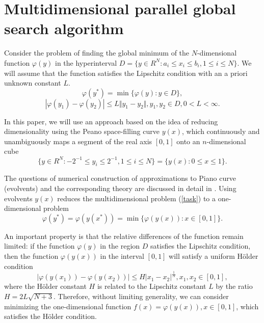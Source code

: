 \documentclass{svproc}
\begin{document}
\section{Multidimensional parallel global search algorithm}
Consider the problem of finding the global minimum of the \(N\)-dimensional function \(\varphi(y)\) in the hyperinterval  \(D=\{y\in R^N:a_i\leqslant x_i\leqslant{b_i}, 1\leqslant{i}\leqslant{N}\}\).  We will assume that the function satisfies the Lipschitz condition with an a priori unknown constant \(L\).
\begin{equation}
\label{task}
\varphi(y^*)=\min\{\varphi(y):y\in D\},
\end{equation}
\begin{equation}
\label{lip}
|\varphi(y_1)-\varphi(y_2)|\leqslant L\Vert y_1-y_2\Vert,y_1,y_2\in D,0<L<\infty.
\end{equation}

In this paper, we will use an approach based on the idea of reducing dimensionality using the Peano space-filling curve \(y(x)\), which continuously and unambiguously maps a segment of the real axis \([0,1]\) onto an \(n\)-dimensional cube
\begin{equation}
\label{cube}
\lbrace y\in R^N:-2^{-1}\leqslant y_i\leqslant 2^{-1},1\leqslant i\leqslant N\rbrace=\{y(x):0\leqslant x\leqslant 1\}.
\end{equation}

The questions of numerical construction of approximations to Piano curve (evolvents) and the corresponding theory are discussed in detail in \cite{Sergeyev2013,Strongin2000}. Using evolvents \(y(x)\) reduces the multidimensional problem (\ref{task}) to a one-dimensional problem
\begin{displaymath}
\label{oneDimTask}
\varphi(y^*)=\varphi(y(x^*))=\min\{\varphi(y(x)):x\in [0,1]\}.
\end{displaymath}

An important property is that the relative differences of the function remain limited: if the function \(\varphi(y)\) in the region \(D\) satisfies the Lipschitz condition, then the function \(\varphi(y(x))\) in the interval \([0,1]\) will satisfy a uniform H{\"o}lder condition
\begin{displaymath}
\label{holder}
|\varphi(y(x_1))-\varphi(y(x_2))|\leqslant H{|x_1-x_2|}^{\frac{1}{N}}, x_1,x_2\in[0,1],
\end{displaymath}
where the H{\"o}lder constant \(H\) is related to the Lipschitz constant \(L\) by the ratio $ H=2L\sqrt{N+3}$. 
Therefore, without limiting generality, we can consider minimizing the one-dimensional function \(f(x)=\varphi(y(x)), x\in[0,1]\), which satisfies the H{\"o}lder condition.
\end{document}
